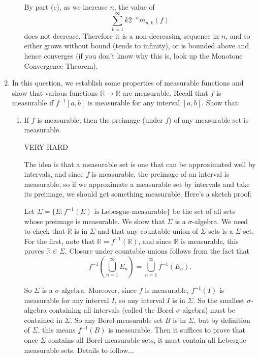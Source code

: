 \documentclass{article}
\begin{document}
\begin{enumerate}
\begin{enumerate}
						{\color{blue}
							By part (c), as we increase $n$, the value of
							\[\sum_{k=1}^\infty k2^{-n}m_{n,k}(f)\]
							does not decrease. Therefore it is a non-decreasing sequence in $n$, and so either grows without bound (tends to infinity), or is bounded above and hence converges (if you don't know why this is, look up the Monotone Convergence Theorem).
						}
					
		\end{enumerate}
	\item In this question, we establish some properties of measurable functions and show that various functions $\mathbb{R}\to\mathbb{R}$ are measurable. Recall that $f$ is measurable if $f^{-1}[a,b]$ is measurable for any interval $[a,b]$. Show that:
		\begin{enumerate}
			\item If $f$ is measurable, then the preimage (under $f$) of any measurable set is measurable.

						{{\color{red} VERY HARD}
						
						\color{blue}
							The idea is that a measurable set is one that can be approximated well by intervals, and since $f$ is measurable, the preimage of an interval is measurable, so if we approximate a measurable set by intervals and take its preimage, we should get something measurable. Here's a sketch proof:\medskip
							
							Let $\Sigma=\{E:f^{-1}(E)\mbox{ is Lebesgue-measurable}\}$ be the set of all sets whose preimage is measurable. We show that $\Sigma$ is a $\sigma$-algebra. We need to check that $\mathbb{R}$ is in $\Sigma$ and that any countable union of $\Sigma$-sets is a $\Sigma$-set. For the first, note that $\mathbb{R}=f^{-1}(\mathbb{R})$, and since $\mathbb{R}$ is measurable, this proves $\mathbb{R}\in \Sigma$. Closure under countable unions follows from the fact that
							\[f^{-1}\left(\bigcup_{n=1}^\infty E_n\right)=\bigcup_{n=1}^\infty f^{-1}(E_n).\]
							
							So $\Sigma$ is a $\sigma$-algebra. Moreover, since $f$ is measurable, $f^{-1}(I)$ is measurable for any interval $I$, so any interval $I$ is in $\Sigma$. So the smallest $\sigma$-algebra containing all intervals (called the Borel $\sigma$-algebra) must be contained in $\Sigma$. So any Borel-measurable set $B$ is in $\Sigma$, but by definition of $\Sigma$, this means $f^{-1}(B)$ is measurable. Then it suffices to prove that once $\Sigma$ contains all Borel-measurable sets, it must contain all Lebesgue measurable sets. Details to follow...
							
}
\end{enumerate}
\end{enumerate}
\end{document}
